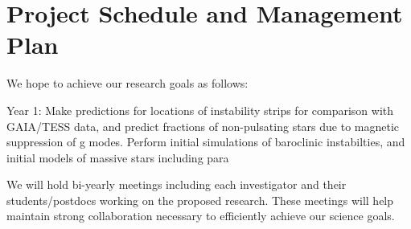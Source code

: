 \section{Project Schedule and Management Plan}

We hope to achieve our research goals as follows:

Year 1: Make predictions for locations of instability strips for comparison with GAIA/TESS data, and predict fractions of non-pulsating stars due to magnetic suppression of g modes. Perform initial simulations of baroclinic instabilties, and initial models of massive stars including para 

We will  hold bi-yearly meetings including each investigator and their students/postdocs working on the proposed research. These meetings will help maintain strong collaboration necessary to efficiently achieve our science goals.
